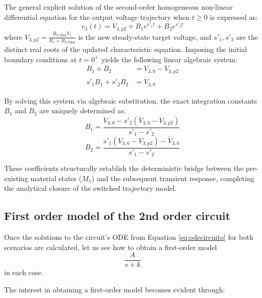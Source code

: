 \documentclass[11pt, a4paper]{article}
\begin{document}
The general explicit solution of the second-order homogeneous non-linear differential equation for the output voltage trajectory when $t \ge 0$ is expressed as:
\begin{equation}
    v_3(t) = V_{3,p2} + B_1 e^{s'_1 t} + B_2 e^{s'_2 t}
\end{equation}
where $V_{3,p2} = \frac{R_{2,\text{final}}V_1}{R_1 + R_{2,\text{final}}}$ is the new steady-state target voltage, and $s'_1, s'_2$ are the distinct real roots of the updated characteristic equation. Imposing the initial boundary conditions at $t=0^+$ yields the following linear algebraic system:
\begin{align}
    B_1 + B_2 &= V_{3,0} - V_{3,p2} \\
    s'_1 B_1 + s'_2 B_2 &= \dot{V}_{3,0}
\end{align}

By solving this system via algebraic substitution, the exact integration constants $B_1$ and $B_2$ are uniquely determined as:
\begin{equation}
    B_1 = \frac{\dot{V}_{3,0} - s'_2(V_{3,0} - V_{3,p2})}{s'_1 - s'_2}
\end{equation}
\begin{equation}
    B_2 = \frac{s'_1(V_{3,0} - V_{3,p2}) - \dot{V}_{3,0}}{s'_1 - s'_2}
\end{equation}

These coefficients structurally establish the deterministic bridge between the pre-existing material states ($M_1$) and the subsequent transient response, completing the analytical closure of the switched trajectory model.



\subsection{First order model of the 2nd order circuit}

Once the solutions to the circuit's ODE from Equation \ref{eq:odecircuito} for both scenarios are calculated, let us see how to obtain a first-order model
\[ \frac{A}{s + k} \]
in each case.

The interest in obtaining a first-order model becomes evident through:
\end{document}

